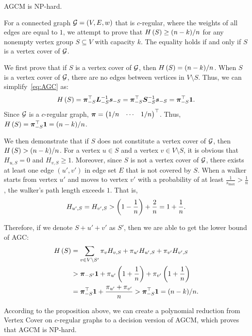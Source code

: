 \documentclass[10pt,journal,compsoc,twocolumn,twoside]{IEEEtran}
\begin{document}
\begin{theorem}\label{thm:np-hard}
    AGCM is NP-hard.
\end{theorem}
\begin{IEEEproof}
    For a connected graph \(\mathcal{G}=(V,E,w)\) that is \(c\)-regular, where the weights of all edges are equal to \(1\), we attempt to prove that \(H\left(S\right)\ge (n-k)/n\) for any nonempty vertex group \(S\subseteq V\) with capacity \(k\).
    The equality holds if and only if \(S\) is a vertex cover of \(\mathcal{G}\).

    We first prove that if \(S\) is a vertex cover of \(\mathcal{G}\), then \(H\left(S\right)=(n-k)/n\). When \(S\) is a vertex cover of \(\mathcal{G}\), there are no edges between vertices in \(V\setminus S\).
    Thus, we can simplify~\eqref{eq:AGC} as:
    \begin{equation*}
        H\left(S\right)=\boldsymbol{\pi}_{-S}^\top\boldsymbol{L}_{-S}^{-1}\boldsymbol{s}_{-S}=\boldsymbol{\pi}_{-S}^\top\boldsymbol{S}_{-S}^{-1}\boldsymbol{s}_{-S}=\boldsymbol{\pi}_{-S}^\top\boldsymbol{1}.
    \end{equation*}
    Since \(\mathcal{G}\) is a \(c\)-regular graph, \(\boldsymbol{\pi}=\begin{pmatrix}1/n&\cdots&1/n\end{pmatrix}^\top\).
    Thus, \(H\left(S\right)=\boldsymbol{\pi}_{-S}^\top\boldsymbol{1}=(n-k)/n\).

    We then demonstrate that if \(S\) does not constitute a vertex cover of \(\mathcal{G}\), then \(H\left(S\right)>(n-k)/n\).
    For a vertex \(u\in S\) and a vertex \(v\in V\setminus S\), it is obvious that \(H_{u,S}=0\) and \(H_{v,S}\ge1\).
    Moreover, since \(S\) is not a vertex cover of \(\mathcal{G}\), there exists at least one edge \((u',v')\) in edge set \(E\) that is not covered by \(S\).
    When a walker starts from vertex \(u'\) and moves to vertex \(v'\) with a probability of at least \(\frac{1}{s_{\max}}>\frac{1}{n}\), the walker's path length exceeds \(1\).
    That is,
    \begin{equation*}
        H_{u',S}=H_{v',S}>\left( 1-\frac{1}{n} \right)+\frac{2}{n}=1+\frac{1}{n}.
    \end{equation*}

    Therefore, if we denote \(S+u'+v'\) as \(S'\), then we are able to get the lower bound of AGC:
    \begin{align*}
        H\left(S\right) & =\sum_{v\in V\setminus S'}\pi_vH_{v,S}+\pi_{u'}H_{u',S}+\pi_{v'}H_{v',S}         \\
                 & >\boldsymbol{\pi}_{-S'}\boldsymbol{1}+\pi_{u'}\left( 1+\frac{1}{n} \right)+\pi_{v'}\left( 1+\frac{1}{n} \right) \\
                 & =\boldsymbol{\pi}_{-S}^\top\boldsymbol{1}+\frac{\pi_{u'}+\pi_{v'}}n
        >\boldsymbol{\pi}_{-S}^\top\boldsymbol{1}=(n-k)/n.
    \end{align*}

    According to the proposition above, we can create a polynomial reduction from Vertex Cover on \(c\)-regular graphs to a decision version of AGCM, which proves that AGCM is NP-hard.

\end{IEEEproof}
\end{document}
